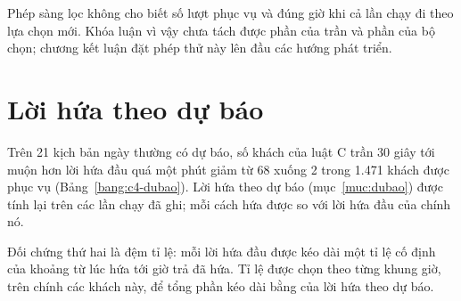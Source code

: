 Phép sàng lọc không cho biết số lượt phục vụ và đúng giờ khi cả lần chạy đi theo lựa chọn mới. Khóa luận vì vậy chưa
tách được phần của trần và phần của bộ chọn; chương kết luận đặt phép thử này lên đầu các hướng phát triển.

\section{Lời hứa theo dự báo}
\label{muc:c4-dubao}

Trên 21 kịch bản ngày thường có dự báo, số khách của luật C trần 30 giây tới muộn hơn lời hứa đầu quá một phút giảm từ
68 xuống 2 trong 1.471 khách được phục vụ (Bảng~\ref{bang:c4-dubao}). Lời hứa theo dự báo (mục~\ref{muc:dubao}) được
tính lại trên các lần chạy đã ghi; mỗi cách hứa được so với lời hứa đầu của chính nó.

Đối chứng thứ hai là đệm tỉ lệ: mỗi lời hứa đầu được kéo dài một tỉ lệ cố định của khoảng từ lúc hứa tới giờ trả đã
hứa. Tỉ lệ được chọn theo từng khung giờ, trên chính các khách này, để tổng phần kéo dài bằng của lời hứa theo dự báo.

